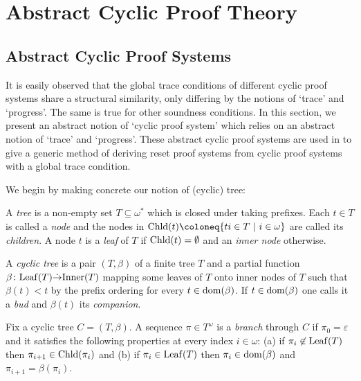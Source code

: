 
\chapter{Abstract Cyclic Proof Theory}
\label{chap:acds}

\section{Abstract Cyclic Proof Systems}
\label{sec:abs-ps}

It is easily observed that the global trace conditions of different cyclic proof
systems share a structural similarity, only differing by the notions of `trace'
and `progress'. The same is true for other soundness conditions. In this section, we present an abstract notion of `cyclic proof system'
which relies on an abstract notion of `trace' and `progress'. These abstract
cyclic proof systems are used in \papOne{} to give a generic method of deriving
reset proof systems from cyclic proof systems with a global trace condition.

We begin by making concrete our notion of (cyclic) tree: 
\begin{definition}[Tree]
  A \emph{tree} is a
  non-empty set $T \subseteq \omega^*$ which is closed under taking prefixes. Each
  $t \in T$ is called a \emph{node} and the nodes in $\Chld(t) \coloneq \{ti \in T
  ~|~ i \in \omega\}$ are called its \emph{children}. A node $t$ is a \emph{leaf} of $T$ if
  $\mathrm{Chld}(t) = \emptyset$ and an \emph{inner node} otherwise.
\end{definition}

\begin{definition}
  A \emph{cyclic tree} is a pair $(T, \beta)$ of a finite tree $T$ and
  a partial function $\beta \colon \mathrm{Leaf}(T) \dot{\to} \mathrm{Inner}(T)$ mapping some leaves of $T$
  onto inner nodes of $T$ such that $\beta(t) < t$ by the prefix ordering for
  every $t \in \mathrm{dom}(\beta)$. 
  If $t \in \mathrm{dom}(\beta)$ one calls it a \emph{bud} and $\beta(t)$ its \emph{companion}.

  Fix a cyclic tree $C = (T, \beta)$. A sequence $\pi \in T^\omega$ is a
  \emph{branch} through $C$ if $\pi_0 = \varepsilon$ and it satisfies the
  following properties at every index $i \in \omega$: (a) if $\pi_i \not\in
  \mathrm{Leaf}(T)$ then $\pi_{i + 1} \in \mathrm{Chld}(\pi_i)$ and (b) if $\pi_i \in \mathrm{Leaf}(T)$
  then $\pi_i \in \mathrm{dom}(\beta)$ and $\pi_{i + 1} = \beta(\pi_i)$.
\end{definition}

